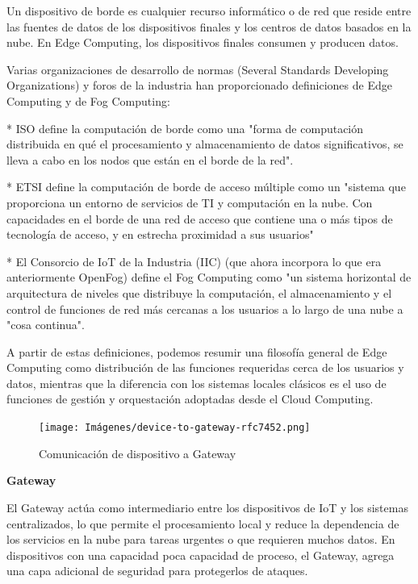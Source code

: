 Un dispositivo de borde es cualquier recurso informático o de red que reside entre las fuentes de datos de los dispositivos finales y los centros de datos basados en la nube.
En Edge Computing, los dispositivos finales consumen y producen datos.

Varias organizaciones de desarrollo de normas (Several Standards Developing Organizations) y foros de la industria han proporcionado definiciones de Edge Computing y de Fog Computing:

   * ISO define la computación de borde como una "forma de computación distribuida en qué el procesamiento y almacenamiento de datos significativos, se lleva a cabo en los nodos que están en el borde de la red".

   * ETSI define la computación de borde de acceso múltiple como un "sistema que proporciona un entorno de servicios de TI y computación en la nube. Con capacidades en el borde de una red de acceso que contiene una o más tipos de tecnología de acceso, y en estrecha proximidad a sus usuarios"

   * El Consorcio de IoT de la Industria (IIC) (que ahora incorpora lo que era anteriormente OpenFog) define el Fog Computing como "un sistema horizontal de arquitectura de niveles que distribuye la computación, el almacenamiento y el control de funciones de red más cercanas a los usuarios a lo largo de una nube a "cosa continua".

   A partir de estas definiciones, podemos resumir una filosofía general de Edge Computing como distribución de las funciones requeridas cerca de los usuarios y datos, mientras que la diferencia con los sistemas locales clásicos es el uso de funciones de gestión y orquestación adoptadas desde el Cloud Computing. \cite{RFC9556}

\begin{figure} %
    \centering
    \texttt{[image: Imágenes/device-to-gateway-rfc7452.png]}
    \caption{Comunicación de dispositivo a Gateway}
    \label{fig:device-to-gateway-rfc7452}
\end{figure}

\textbf{Gateway}

El Gateway actúa como intermediario entre los dispositivos de IoT y los sistemas centralizados, lo que permite el procesamiento local y reduce la dependencia de los servicios en la nube para tareas urgentes o que requieren muchos datos. En dispositivos con una capacidad poca capacidad de proceso, el Gateway, agrega una capa adicional de seguridad para protegerlos de ataques.\cite{RFC9556}

